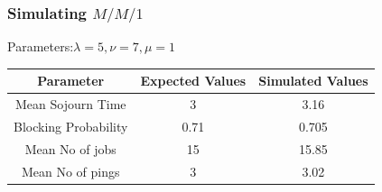 \documentclass{beamer}
\newcommand{\ft}[1]{\frametitle{#1}}
\begin{document}
\begin{frame}
 \ft{Simulating $M/M/1$}
\begin{itemize}\setlength\itemsep{.8em}


    
Parameters:$\lambda=5, \nu=7, \mu=1$
\begin{table}[htbp]
    \centering
    \begin{tabular}{|c|c|c|}
        \hline
        Parameter & Expected Values & Simulated Values  \\
        \hline
        Mean Sojourn Time & 3 & 3.16 \\
        Blocking Probability & 0.71 & 0.705 \\
        Mean No of jobs & 15 & 15.85 \\
        Mean No of pings & 3 & 3.02 \\
        \hline
    \end{tabular}
\end{table}

\end{itemize}
\end{frame}
\end{document}
